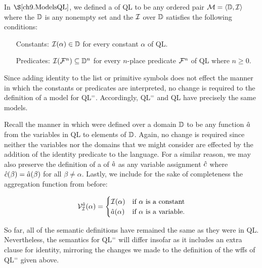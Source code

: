 In $\S\ref{ch9.ModelsQL}$, we defined a  of QL to be any ordered pair $\mathcal{M}=\langle\mathbb{D},\mathcal{I}\rangle$ where the  $\mathbb{D}$ is any nonempty set and the  $\mathcal{I}$ over $\mathbb{D}$ satisfies the following conditions: 

\begin{enumerate}[leftmargin=1.5in]
  \item[\sc Constants:] $\mathcal{I}(\alpha)\in\mathbb{D}$ for every constant $\alpha$ of QL. 
  \item[\sc Predicates:] $\mathcal{I}(\mathcal{F}^n)\subseteq\mathbb{D}^n$ for every $n$-place predicate $\mathcal{F}^n$ of QL where $n\geq 0$.
\end{enumerate}

Since adding identity to the list or primitive symbols does not effect the manner in which the constants or predicates are interpreted, no change is required to the definition of a model for QL$^=$.
Accordingly, QL$^=$ and QL have precisely the same models. 

Recall the manner in which  were defined over a domain $\mathbb{D}$ to be any function $\hat{a}$ from the variables in QL to elements of $\mathbb{D}$.
Again, no change is required since neither the variables nor the domains that we might consider are effected by the addition of the identity predicate to the language.
For a similar reason, we may also preserve the definition of a  of $\hat{a}$ as any variable assignment $\hat{c}$ where $\hat{c}(\beta)=\hat{a}(\beta)$ for all $\beta\neq\alpha$.
Lastly, we include for the sake of completeness the aggregation function from before:

\vspace{-.2in}
\begin{align*}
  \mathcal{V}_{\mathcal{I}}^{\hat{a}}{(\alpha)}=
    \begin{cases}
      \mathcal{I}(\alpha) & \text{if } \alpha \text{ is a constant} \\
      \hat{a}(\alpha) & \text{if } \alpha \text{ is a variable.}
    \end{cases}
\end{align*}

So far, all of the semantic definitions have remained the same as they were in QL.
Nevertheless, the semantics for QL$^=$ will differ insofar as it includes an extra clause for identity, mirroring the changes we made to the definition of the wffs of QL$^=$ given above. 

